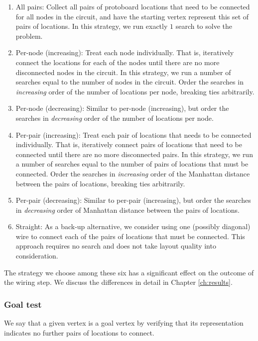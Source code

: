 \begin{enumerate}
\item All pairs: Collect all pairs of protoboard locations that need to be
connected for all nodes in the circuit, and have the starting vertex represent
this set of pairs of locations. In this strategy, we run exactly $1$ search to
solve the problem.
\item Per-node (increasing): Treat each node individually. That is, iteratively
connect the locations for each of the nodes until there are no more disconnected
nodes in the circuit. In this strategy, we run a number of searches equal to the
number of nodes in the circuit. Order the searches in
\emph{increasing} order of the number of locations per node, breaking ties
arbitrarily.
\item Per-node (decreasing): Similar to per-node (increasing), but order the
searches in \emph{decreasing} order of the number of locations per node.
\item Per-pair (increasing): Treat each pair of locations that needs to be
connected individually. That is, iteratively connect pairs of locations that need
to be connected until there are no more disconnected pairs.
In this strategy, we run a number of searches equal to the number of pairs of
locations that must be connected. Order the searches in \emph{increasing} order
of the Manhattan distance between the pairs of locations, breaking ties
arbitrarily.
\item Per-pair (decreasing): Similar to per-pair (increasing), but order the
searches in \emph{decreasing} order of Manhattan distance between the pairs of
locations.
\item Straight: As a back-up alternative, we consider using one (possibly
diagonal) wire to connect
each of the pairs of locations that must be connected. This approach requires no
search and does not take layout quality into consideration.
\end{enumerate}

The strategy we choose among these six
has a significant effect on the outcome of the wiring step.
We discuss the differences in detail in Chapter \ref{ch:results}.

\subsubsection{Goal test}

We say that a given vertex is a goal vertex by verifying that its
representation indicates no further pairs of locations to connect.

